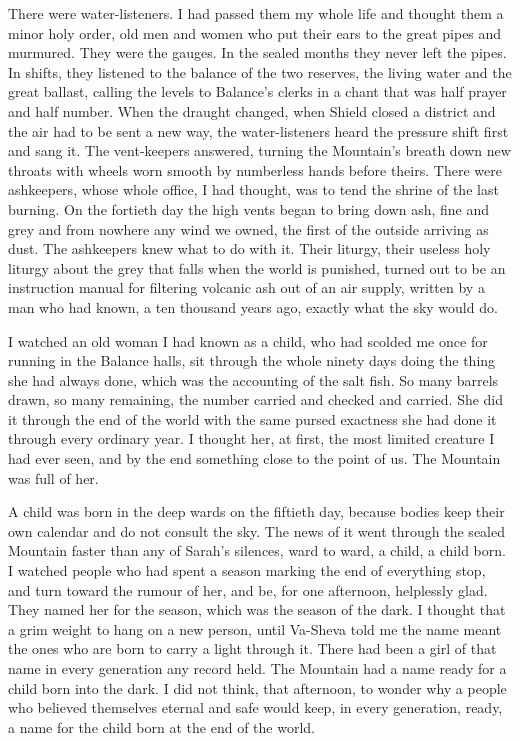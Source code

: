 There were water-listeners. I had passed them my whole life and thought them a minor holy order, old men and women who put their ears to the great pipes and murmured. They were the gauges. In the sealed months they never left the pipes. In shifts, they listened to the balance of the two reserves, the living water and the great ballast, calling the levels to Balance's clerks in a chant that was half prayer and half number. When the draught changed, when Shield closed a district and the air had to be sent a new way, the water-listeners heard the pressure shift first and sang it. The vent-keepers answered, turning the Mountain's breath down new throats with wheels worn smooth by numberless hands before theirs. There were ashkeepers, whose whole office, I had thought, was to tend the shrine of the last burning. On the fortieth day the high vents began to bring down ash, fine and grey and from nowhere any wind we owned, the first of the outside arriving as dust. The ashkeepers knew what to do with it. Their liturgy, their useless holy liturgy about the grey that falls when the world is punished, turned out to be an instruction manual for filtering volcanic ash out of an air supply, written by a man who had known, a ten thousand years ago, exactly what the sky would do.\par

I watched an old woman I had known as a child, who had scolded me once for running in the Balance halls, sit through the whole ninety days doing the thing she had always done, which was the accounting of the salt fish. So many barrels drawn, so many remaining, the number carried and checked and carried. She did it through the end of the world with the same pursed exactness she had done it through every ordinary year. I thought her, at first, the most limited creature I had ever seen, and by the end something close to the point of us. The Mountain was full of her.\par

A child was born in the deep wards on the fiftieth day, because bodies keep their own calendar and do not consult the sky. The news of it went through the sealed Mountain faster than any of Sarah's silences, ward to ward, a child, a child born. I watched people who had spent a season marking the end of everything stop, and turn toward the rumour of her, and be, for one afternoon, helplessly glad. They named her for the season, which was the season of the dark. I thought that a grim weight to hang on a new person, until Va-Sheva told me the name meant the ones who are born to carry a light through it. There had been a girl of that name in every generation any record held. The Mountain had a name ready for a child born into the dark. I did not think, that afternoon, to wonder why a people who believed themselves eternal and safe would keep, in every generation, ready, a name for the child born at the end of the world.\par

